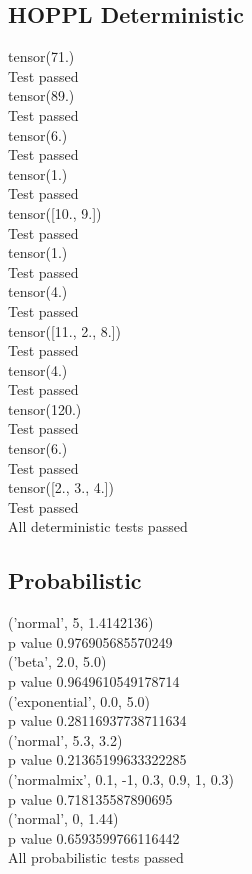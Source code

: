 \documentclass{article}
\begin{document}
\subsection{HOPPL Deterministic}
tensor(71.)\\
Test passed\\
tensor(89.)\\
Test passed\\
tensor(6.)\\
Test passed\\
tensor(1.)\\
Test passed\\
tensor([10.,  9.])\\
Test passed\\
tensor(1.)\\
Test passed\\
tensor(4.)\\
Test passed\\
tensor([11.,  2.,  8.])\\
Test passed\\
tensor(4.)\\
Test passed\\
tensor(120.)\\
Test passed\\
tensor(6.)\\
Test passed\\
tensor([2., 3., 4.])\\
Test passed\\
All deterministic tests passed\\

\subsection{Probabilistic}
('normal', 5, 1.4142136)\\
p value 0.976905685570249\\
('beta', 2.0, 5.0)\\
p value 0.9649610549178714\\
('exponential', 0.0, 5.0)\\
p value 0.28116937738711634\\
('normal', 5.3, 3.2)\\
p value 0.21365199633322285\\
('normalmix', 0.1, -1, 0.3, 0.9, 1, 0.3)\\
p value 0.718135587890695\\
('normal', 0, 1.44)\\
p value 0.6593599766116442\\
All probabilistic tests passed\\
\end{document}
